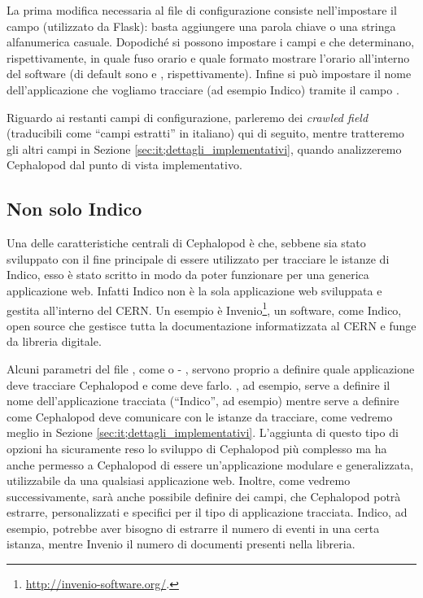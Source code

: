             La prima modifica necessaria al file di configurazione consiste nell'impostare il campo  (utilizzato da Flask): basta aggiungere una parola chiave o una stringa alfanumerica casuale. Dopodiché si possono impostare i campi  e  che determinano, rispettivamente, in quale fuso orario e quale formato mostrare l'orario all'interno del software (di default sono  e , rispettivamente). Infine si può impostare il nome dell'applicazione che vogliamo tracciare (ad esempio Indico) tramite il campo .
            
            Riguardo ai restanti campi di configurazione, parleremo dei \textit{crawled field} (traducibili come ``campi estratti'' in italiano) qui di seguito, mentre tratteremo gli altri campi in Sezione \ref{sec:it;dettagli_implementativi}, quando analizzeremo Cephalopod dal punto di vista implementativo.
            
        \subsection{Non solo Indico} \label{sec:it;cp;non_solo_indico}
        
            Una delle caratteristiche centrali di Cephalopod è che, sebbene sia stato sviluppato con il fine principale di essere utilizzato per tracciare le istanze di Indico, esso è stato scritto in modo da poter funzionare per una generica applicazione web. Infatti Indico non è la sola applicazione web sviluppata e gestita all'interno del \ac{CERN}. Un esempio è Invenio\footnote{\url{http://invenio-software.org/}.}, un software, come Indico, open source che gestisce tutta la documentazione informatizzata al \ac{CERN} e funge da libreria digitale.
            
            Alcuni parametri del file , come  o - , servono proprio a definire quale applicazione deve tracciare Cephalopod e come deve farlo. , ad esempio, serve a definire il nome dell'applicazione tracciata (``Indico'', ad esempio) mentre  serve a definire come Cephalopod deve comunicare con le istanze da tracciare, come vedremo meglio in Sezione \ref{sec:it;dettagli_implementativi}. L'aggiunta di questo tipo di opzioni ha sicuramente reso lo sviluppo di Cephalopod più complesso ma ha anche permesso a Cephalopod di essere un'applicazione modulare e generalizzata, utilizzabile da una qualsiasi applicazione web. Inoltre, come vedremo successivamente, sarà anche possibile definire dei campi, che Cephalopod potrà estrarre, personalizzati e specifici per il tipo di applicazione tracciata. Indico, ad esempio, potrebbe aver bisogno di estrarre il numero di eventi in una certa istanza, mentre Invenio il numero di documenti presenti nella libreria.
            
